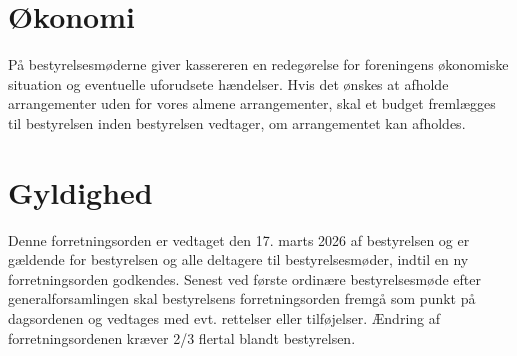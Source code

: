 \section{Økonomi}
På bestyrelsesmøderne giver kassereren en redegørelse for foreningens økonomiske situation og eventuelle 
uforudsete hændelser. Hvis det ønskes at afholde arrangementer uden for vores almene arrangementer, skal et 
budget fremlægges til bestyrelsen inden bestyrelsen vedtager, om arrangementet kan afholdes.

\section{Gyldighed}
Denne forretningsorden er vedtaget den 17. marts 2026 af bestyrelsen og er gældende for bestyrelsen og 
alle deltagere til bestyrelsesmøder, indtil en ny forretningsorden godkendes. Senest ved første ordinære 
bestyrelsesmøde efter generalforsamlingen skal bestyrelsens forretningsorden fremgå som punkt på dagsordenen 
og vedtages med evt. rettelser eller tilføjelser. Ændring af forretningsordenen kræver 2/3 flertal blandt 
bestyrelsen.


